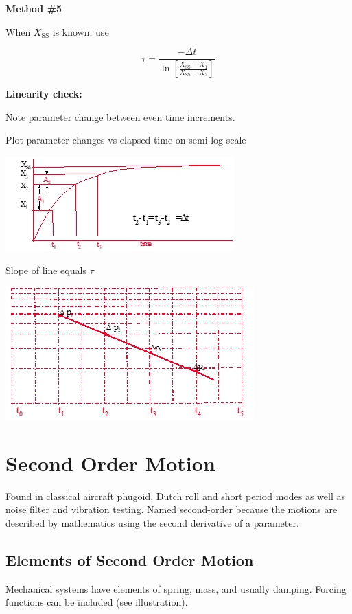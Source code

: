 \documentclass[
]{book}
\begin{document}
\textbf{Method \#5}

When \(X_{\mathrm{SS}}\) is known, use

\[\tau = \frac{-\Delta t}{\ln \left[ \frac{X_{\mathrm{SS}} - X_1}{X_{\mathrm{SS}} - X_2} \right]} \]

\textbf{Linearity check:}

Note parameter change between even time increments.

Plot parameter changes vs elapsed time on semi-log scale

\includegraphics{media/08/image26.png}

Slope of line equals \(\tau\)

\includegraphics{media/08/image27.png}

\hypertarget{second-order-motion}{%
\section{Second Order Motion}\label{second-order-motion}}

Found in classical aircraft phugoid, Dutch roll and short period modes as well as noise filter and vibration testing. Named second-order because the motions are described by mathematics using the second derivative of a parameter.

\hypertarget{elements-of-second-order-motion}{%
\subsection{Elements of Second Order Motion}\label{elements-of-second-order-motion}}

Mechanical systems have elements of spring, mass, and usually damping. Forcing functions can be included (see illustration).
\end{document}
